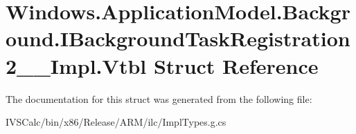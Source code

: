\hypertarget{struct_windows_1_1_application_model_1_1_background_1_1_i_background_task_registration2_____impl_1_1_vtbl}{}\section{Windows.\+Application\+Model.\+Background.\+I\+Background\+Task\+Registration2\+\_\+\+\_\+\+Impl.\+Vtbl Struct Reference}
\label{struct_windows_1_1_application_model_1_1_background_1_1_i_background_task_registration2_____impl_1_1_vtbl}


The documentation for this struct was generated from the following file\+:\begin{DoxyCompactItemize}
\item 
I\+V\+S\+Calc/bin/x86/\+Release/\+A\+R\+M/ilc/Impl\+Types.\+g.\+cs\end{DoxyCompactItemize}

